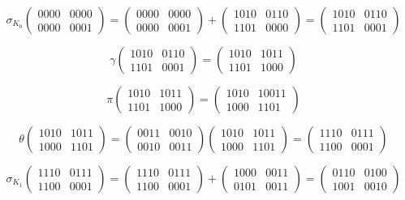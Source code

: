 \documentclass[a4paper]{article}
\begin{document}
$$\sigma_{K_0} \begin{pmatrix} 0000 & 0000 \\ 0000 & 0001 \end{pmatrix} = \begin{pmatrix} 0000 & 0000 \\ 0000 & 0001 \end{pmatrix} + \begin{pmatrix} 1010 & 0110 \\ 1101 & 0000 \end{pmatrix} = \begin{pmatrix} 1010 & 0110 \\ 1101 & 0001 \end{pmatrix}$$

$$\gamma \begin{pmatrix} 1010 & 0110 \\ 1101 & 0001 \end{pmatrix} = \begin{pmatrix} 1010 & 1011 \\ 1101 & 1000 \end{pmatrix}$$

$$\pi \begin{pmatrix} 1010 & 1011 \\ 1101 & 1000 \end{pmatrix} = \begin{pmatrix} 1010 & 10011 \\ 1000 & 1101 \end{pmatrix}$$

$$\theta \begin{pmatrix} 1010 & 1011 \\ 1000 & 1101 \end{pmatrix} = \begin{pmatrix} 0011 & 0010 \\ 0010 & 0011 \end{pmatrix}\begin{pmatrix} 1010 & 1011 \\ 1000 & 1101 \end{pmatrix} = \begin{pmatrix} 1110 & 0111 \\ 1100 & 0001 \end{pmatrix}$$

$$\sigma_{K_1} \begin{pmatrix} 1110 & 0111 \\ 1100 & 0001 \end{pmatrix} = \begin{pmatrix} 1110 & 0111 \\ 1100 & 0001 \end{pmatrix} + \begin{pmatrix} 1000 & 0011 \\ 0101 & 0011 \end{pmatrix} = \begin{pmatrix} 0110 & 0100 \\ 1001 & 0010 \end{pmatrix}$$
\end{document}
